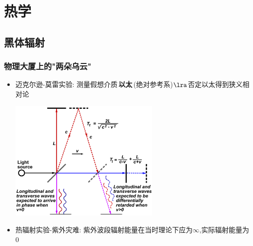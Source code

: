 \documentclass{article}
\begin{document}
\vspace{2em}

\section{热学}
\subsection{黑体辐射}

\subsubsection{物理大厦上的"两朵乌云"}
\begin{itemize}
    \item 迈克尔逊-莫雷实验: 测量假想介质\,\textbf{以太}\,(绝对参考系)$\lra$否定以太得到狭义相对论

          \vspace{1em}

          \includegraphics[width=20em,keepaspectratio]{./pictures/4.png}

          \vspace{1em}

    \item 热辐射实验-紫外灾难: 紫外波段辐射能量在当时理论下应为$\infty$,实际辐射能量为$0$
\end{itemize}

\vspace{2em}
\end{document}
